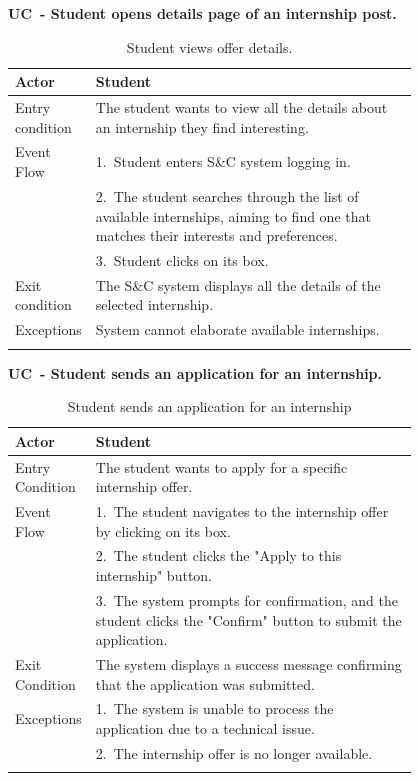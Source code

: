 \textbf{UC\cuc\  - Student opens details page of an internship post.}

\begin{center}
    \renewcommand{\arraystretch}{1.2}
    \begin{longtable}{ l p{0.8\linewidth} } 
        \hline
        Actor & Student \\ \hline
        Entry condition & The student wants to view all the details about an internship they find interesting.\\ \hline
        Event Flow & 1.\ Student enters S\&C system logging in.\\
        & 2.\ The student searches through the list of available internships, aiming to find one that matches their interests and preferences.\\
        & 3.\ Student clicks on its box.\\ \hline
        Exit condition & The S\&C system displays all the details of the selected internship. \\ \hline
        Exceptions  & System cannot elaborate available internships.
        \\ \hline
        \caption{Student views offer details.}
        \label{tab:goals_tab}%
    \end{longtable}
\end{center}

\textbf{UC\cuc\  - Student sends an application for an internship.}

\begin{center} 
    \renewcommand{\arraystretch}{1.2} 
    \begin{longtable}{ l p{0.8\linewidth} } 
        \hline 
        Actor & Student \\ \hline 
        Entry Condition & The student wants to apply for a specific internship offer. \\ \hline 
        Event Flow & 1.\ The student navigates to the internship offer by clicking on its box. \\ 
        & 2.\ The student clicks the "Apply to this internship" button. \\ 
        & 3.\ The system prompts for confirmation, and the student clicks the "Confirm" button to submit the application. \\ \hline 
        Exit Condition & The system displays a success message confirming that the application was submitted. \\ \hline 
        Exceptions & 1.\ The system is unable to process the application due to a technical issue. \\ 
        & 2.\ The internship offer is no longer available. \\ \hline 
        \caption{Student sends an application for an internship} 
        \label{tab:student_application_uc} 
    \end{longtable} 
\end{center}

